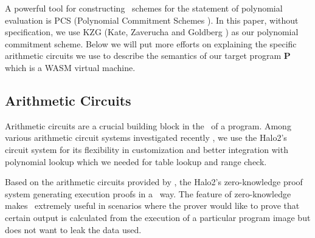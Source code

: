 \smallskip A powerful tool for constructing \zksnark\, schemes for the statement of polynomial evaluation is PCS (Polynomial Commitment Schemes \cite{boneh2020halo-pcs,boneh2020efficient-pcs,kate2010polynomial-pcs}). In this paper, without specification, we use KZG (Kate, Zaverucha and Goldberg \cite{kate2010polynomial-pcs}) as our polynomial commitment scheme. Below we will put more efforts on explaining the specific arithmetic circuits we use to describe the semantics of our target program $\mathbf{P}$ which is a WASM virtual machine.


\subsection{Arithmetic Circuits}
\label{chp:arith-circuits}
Arithmetic circuits are a crucial building block in the \zksnark\, of a program. Among various arithmetic circuit systems investigated recently \cite{hoffmann2019efficient-r1cs, gabizon2019plonk, pearson2022plonkup}, we use the Halo2's \cite{halo2book} circuit system for its flexibility in customization and better integration with polynomial lookup which we needed for table lookup and range check.

Based on the arithmetic circuits provided by \zkwasm, the Halo2's zero-knowledge proof system generating execution proofs in a \zksnark\, way. %
The feature of zero-knowledge makes \zkwasm\, extremely useful in scenarios where the prover would like to prove that certain output is calculated from the execution of a particular program image but does not want to leak the data used.

